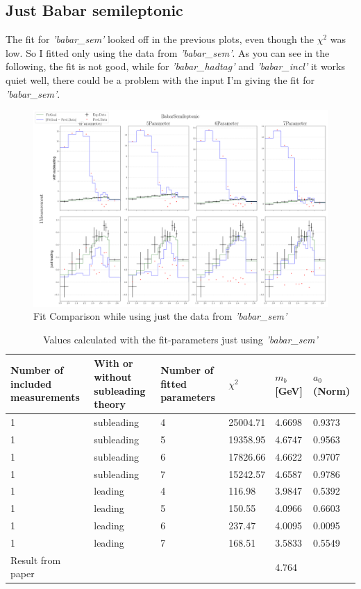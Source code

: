 \documentclass[a4paper,12pt]{article}
\begin{document}
\subsection{Just Babar semileptonic}
The fit for \textit{'babar\_sem'} looked off in the previous plots, even though the $\chi^2$ was low. So I fitted only using the data from \textit{'babar\_sem'}. As you can see in the following,
the fit is not good, while for \textit{'babar\_hadtag'} and \textit{'babar\_incl'} it works quiet well, there could be a problem with the input I'm giving the fit for \textit{'babar\_sem'}.
\begin{figure}[H]
    \centering
    \includegraphics[scale=0.3]{../compare/just_babar_sem.png}
    \caption{Fit Comparison while using just the data from \textit{'babar\_sem'}}
\end{figure}

\begin{table}[H]
    \begin{tabular}{|p{3.5cm}|p{3.5cm}|p{3.5cm}|l|l|l|}
        \hline
        Number of included measurements & With or without subleading theory & Number of fitted parameters & $\chi^2$ & $m_b$ [\unit{GeV}] & $a_0$ (Norm) \\
        \hline
        1&subleading&4&25004.71&4.6698&0.9373\\
        1&subleading&5&19358.95&4.6747&0.9563\\
        1&subleading&6&17826.66&4.6622&0.9707\\
        1&subleading&7&15242.57&4.6587&0.9786\\
        1&leading&4&116.98&3.9847&0.5392\\
        1&leading&5&150.55&4.0966&0.6603\\
        1&leading&6&237.47&4.0095&0.0095\\
        1&leading&7&168.51&3.5833&0.5549\\
        \hline
        \hline
        Result from paper&&&&4.764&\\
        \hline 
    \end{tabular}
    \caption{Values calculated with the fit-parameters just using \textit{'babar\_sem'}}
\end{table}
\end{document}
